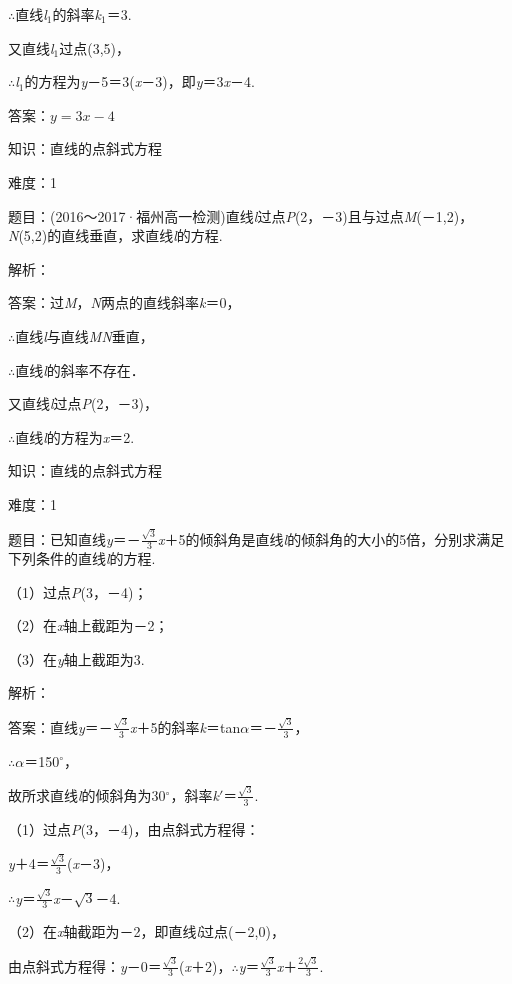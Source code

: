 \documentclass{article} %
\begin{document}
$\mathrm{\therefore}$直线\textit{l}${}_{1}$的斜率\textit{k}${}_{1}$＝3.

又直线\textit{l}${}_{1}$过点(3,5)，

$\mathrm{\therefore}$\textit{l}${}_{1}$的方程为\textit{y}－5＝3(\textit{x}－3)，即\textit{y}＝3\textit{x}－4.

答案：$y=3x-4$

知识：直线的点斜式方程

难度：1

题目：(2016～2017·福州高一检测)直线\textit{l}过点\textit{P}(2，－3)且与过点\textit{M}(－1,2)，\textit{N}(5,2)的直线垂直，求直线\textit{l}的方程.

解析：

答案：过\textit{M}，\textit{N}两点的直线斜率\textit{k}＝0，

$\mathrm{\therefore}$直线\textit{l}与直线\textit{MN}垂直，

$\mathrm{\therefore}$直线\textit{l}的斜率不存在．

又直线\textit{l}过点\textit{P}(2，－3)，

$\mathrm{\therefore}$直线\textit{l}的方程为\textit{x}＝2.


知识：直线的点斜式方程

难度：1

题目：已知直线\textit{y}＝－$\frac{\sqrt{3}}{3}$\textit{x}＋5的倾斜角是直线\textit{l}的倾斜角的大小的5倍，分别求满足下列条件的直线\textit{l}的方程.

（1）过点\textit{P}(3，－4)；

（2）在\textit{x}轴上截距为－2；

（3）在\textit{y}轴上截距为3.

解析：

答案：直线\textit{y}＝－$\frac{\sqrt{3}}{3}$\textit{x}＋5的斜率\textit{k}＝tan\textit{$\alpha$}＝－$\frac{\sqrt{3}}{3}$，

$\mathrm{\therefore}$\textit{$\alpha$}＝150$\mathrm{{}^\circ}$，

故所求直线\textit{l}的倾斜角为30$\mathrm{{}^\circ}$，斜率\textit{k}$'$＝$\frac{\sqrt{3}}{3}$.

（1）过点\textit{P}(3，－4)，由点斜式方程得：

\textit{y}＋4＝$\frac{\sqrt{3}}{3}$(\textit{x}－3)，

$\mathrm{\therefore}$\textit{y}＝$\frac{\sqrt{3}}{3}$\textit{x}－$\sqrt{3}$－4.

（2）在\textit{x}轴截距为－2，即直线\textit{l}过点(－2,0)，

由点斜式方程得：\textit{y}－0＝$\frac{\sqrt{3}}{3}$(\textit{x}＋2)，$\mathrm{\therefore}$\textit{y}＝$\frac{\sqrt{3}}{3}$\textit{x}＋$\frac{2\sqrt{3}}{3}$.
\end{document}
